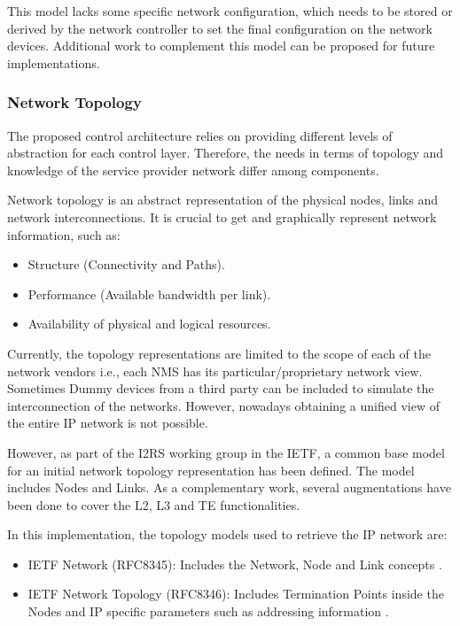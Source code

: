 \documentclass[a4paper,fleqn]{cas-dc}
\begin{document}
This model lacks some specific network configuration, which needs to be stored or derived by the network controller to set the final configuration on the network devices. Additional work to complement this model can be proposed for future implementations.  

\subsubsection{Network Topology}
\label{subsection:IPtopo}

The proposed control architecture relies on providing different levels of abstraction for each control layer. Therefore, the needs in terms of topology and knowledge of the service provider network differ among components. 

Network topology is an abstract representation of the physical nodes, links and network interconnections. It is crucial to get and graphically represent network information, such as:
\begin{itemize}
    \item Structure (Connectivity and Paths).
    \item Performance (Available bandwidth per link).
    \item Availability of physical and logical resources.
\end{itemize}

Currently, the topology representations are limited to the scope of each of the network vendors i.e., each NMS has its particular/proprietary network view. Sometimes Dummy devices from a third party can be included to simulate the interconnection of the networks. However, nowadays obtaining a unified view of the entire IP network is not possible.

However, as part of the I2RS working group in the IETF, a common base model for an initial network topology representation has been defined. The model includes Nodes and Links. As a complementary work, several augmentations have been done to cover the L2, L3 and TE functionalities.

In this implementation, the topology models used to retrieve the IP network are: 
\begin{itemize}
\item IETF Network (RFC8345): Includes the Network, Node and Link concepts \cite{clemm2018yang}.
\item IETF Network Topology (RFC8346): Includes Termination Points inside the Nodes and IP specific parameters such as addressing information \cite{varga2018internet}.
\end{itemize}
\end{document}
